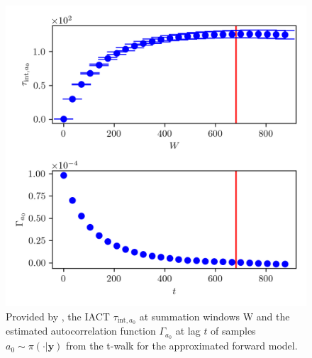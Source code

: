 \begin{figure}[ht!]
	\centering
	\includegraphics{UwerrTauIntTWalk9.png}
	\caption[IACT and autocorrelation function of samples $a_0 \sim \pi(\cdot|\bm{y})$, for approximated model.]{Provided by \cite{drikHesse}, the IACT $\tau_{\text{int},a_0}$ at summation windows W and the estimated autocorrelation function $\Gamma_{a_0}$ at lag $t$ of samples $a_0 \sim \pi( \cdot| \bm{y})$ from the t-walk for the approximated forward model.}
\end{figure}

